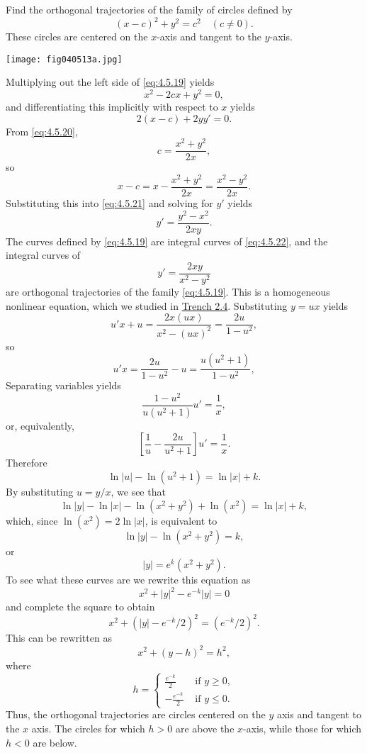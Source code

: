 \documentclass{ximera}
\begin{document}
\begin{example}\label{example:4.5.11}
Find the orthogonal trajectories of the family of circles defined by
\begin{equation} \label{eq:4.5.19}
(x-c)^2+y^2=c^2 \quad (c\neq 0).
\end{equation}
 These circles are centered on the $x$-axis and tangent to the
$y$-axis.
 
\begin{image}
  \texttt{[image: fig040513a.jpg]}
\end{image}
 
\begin{explanation}
Multiplying out the left side of \eqref{eq:4.5.19} yields
\begin{equation} \label{eq:4.5.20}
x^2-2cx+y^2=0,
\end{equation}
and differentiating this implicitly with respect to $x$ yields
\begin{equation} \label{eq:4.5.21}
2(x-c)+2yy'=0.
\end{equation}
 From \eqref{eq:4.5.20},
$$
c=\frac{x^2+y^2}{2x},
$$
so
$$
x-c=x-\frac{x^2+y^2}{2x}=\frac{x^2-y^2}{2x}.
$$
Substituting this into \eqref{eq:4.5.21} and solving for $y'$ yields
\begin{equation} \label{eq:4.5.22}
y'=\frac{y^2-x^2}{2xy}.
\end{equation}
The curves defined by \eqref{eq:4.5.19} are integral curves of
\eqref{eq:4.5.22}, and the integral curves of
$$
y'=\frac{2xy}{x^2-y^2}
$$
are orthogonal trajectories of the family \eqref{eq:4.5.19}. This is a
homogeneous nonlinear equation, which we studied in
\href{https://ximera.osu.edu/ode/main/nonlinearToSeparable/nonlinearToSeparable}{Trench 2.4}. Substituting $y=ux$ yields
$$
u'x+u=\frac{2x(ux)}{x^2-(ux)^2}=\frac{2u}{1-u^2},
$$
so
$$
u'x=\frac{2u}{1-u^2}-u=\frac{u(u^2+1)}{1-u^2},
$$
Separating variables yields
$$
\frac{1-u^2}{u(u^2+1)}u'=\frac{1}{x},
$$
or, equivalently,
$$
\left[\frac{1}{u}-\frac{2u}{u^2+1}\right]u'=\frac{1}{x}.
$$
Therefore
$$
\ln |u|-\ln (u^2+1)=\ln |x|+k.
$$
By substituting $u=y/x$, we see that
$$
\ln|y|-\ln|x|-\ln(x^2+y^2)+\ln(x^2)=\ln|x|+k,
$$
which, since $\ln(x^2)=2\ln|x|$, is equivalent to
$$
\ln|y|-\ln(x^2+y^2)=k,
$$
or
$$
|y|=e^k(x^2+y^2).
$$
To see what these curves are we rewrite this equation as
$$
x^2+|y|^2-e^{-k}|y|=0
$$
and complete the square to obtain
$$
x^2+(|y|-e^{-k}/2)^2=(e^{-k}/2)^2.
$$
This can be rewritten as
$$
x^2+(y-h)^2=h^2,
$$
where
$$
h=\left\{\begin{array}{rl} \frac{e^{-k}}{2}&\mbox{ if } y\geq
0,\\-\frac{e^{-k}}{2}&\mbox{ if } y\leq 0. \end{array}\right.
$$
Thus, the orthogonal trajectories are circles centered on the $y$ axis
and tangent to the $x$ axis. The circles
for which $h>0$ are above the $x$-axis, while those for which $h<0$
are below.
 

\end{explanation}
\end{example}
\end{document}
